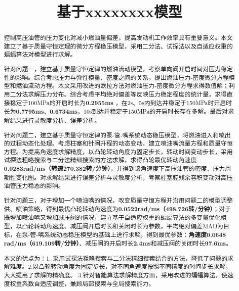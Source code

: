 \documentclass{whutmod}
\title{基于xxxxxxxx模型}
\begin{document}
	\maketitle
	\thispagestyle{empty}
	\begin{abstract}
		控制高压油管的压力变化对减小燃油量偏差，提高发动机工作效率具有重要意义。本文建立了基于质量守恒定理的微分方程稳压模型，采用二分法、试探法以及自适应权重的蝙蝠算法对模型进行求解。
		\vspace{6pt}	%
	
		针对问题一，建立基于质量守恒定律的燃油流动模型，考察单向阀开启时间对压力稳定性的影响。综合考虑压力与弹性模量、密度之间的关系，提出燃油压力-密度微分方程模型和燃油流动方程。本文采用改进的欧拉方法对燃油压力-密度微分方程求得数值解；利用二分法求解压力分布。综合考虑平均绝对偏差等反映压力稳定程度的统计量，求得直接稳定于100MPa的开启时长为\textbf{0.2955ms} ，在2s、5s内到达并稳定于150MPa时开启时长为\textbf{0.7795ms}、\textbf{0.6734ms}，10s到达并稳定于150MPa的开启时长存在多解。最后对求解结果进行灵敏度分析、误差分析。
		\vspace{6pt}	%
	
		针对问题二，建立基于质量守恒定律的泵-管-嘴系统动态稳压模型，将燃油进入和喷出的过程动态化处理。考虑柱塞和针阀升程的动态变动，建立喷油嘴流量方程和质量守恒方程。为提高角速度求解精度，以凸轮转动角度为固定步长，转动时间变动步长，采用试探法粗略搜索与二分法精细搜索的方法求解，求得凸轮最优转动角速度\textbf{0.0283rad/ms（转速270.382转/分钟）}，并得到该角速度下高压油管的密度、压力周期性变化图。对求解结果进行误差分析与灵敏度分析，考察柱塞腔残余容积变动对高压油管压力稳态的影响。
		\vspace{6pt}	%
	
		针对问题三，对于增加一个喷油嘴的情况，改变质量守恒方程并沿用问题二的模型调整供、喷油策略，得到最优凸轮转动角速度为\textbf{0.0522rad/ms（498.726转/分钟）}；对于既增加喷油嘴又增加减压阀的情况，建立基于自适应权重的蝙蝠算法的多变量优化模型，以凸轮转动角速度、减压阀开启时长和关闭时长为参数，平均绝对偏差MAD为目标，在泵-管-嘴系统动态稳压模型的基础上进行求解，得到最优参数：\textbf{角速度0.0648 rad/ms（619.109转/分钟）}、减压阀的开启时长\textbf{2.4ms}和减压阀的关闭时长\textbf{97.6ms}。
		\vspace{6pt}	%
	
		本文的优点为：1. 采用试探法粗略搜索与二分法精细搜索结合的方法，降低了问题的求解难度。2.以凸轮转动角度为固定步长，对不同角速度按照不同精度的时间步长求解，大大提高了求解的精确度。 3.针对智能算法求解精度方面，采用改进的蝙蝠算法，使速度权重系数自适应调整，兼顾局部搜索与全局搜索能力。
		
	\end{abstract}
\end{document}
